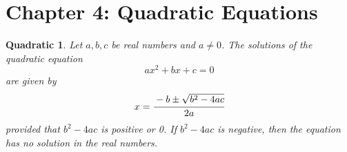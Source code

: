 \section{Chapter 4: Quadratic Equations}
\theoremstyle{plain}
\newtheorem{quadratic}{Quadratic}[section]
\begin{quadratic}
Let $a, b, c$ be real numbers and $a \neq 0$. The solutions of the quadratic equation
\[
ax^2 + bx + c = 0
\]
are given by
\[
x = \cfrac{-b \pm \sqrt{b^2 - 4ac}}{2a}
\]
provided that $b^2 - 4ac$ is positive or 0. If $b^2 - 4ac$ is negative, then the equation has no solution in the real numbers.
\end{quadratic}
